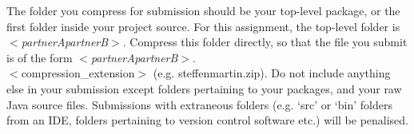 \documentclass[11pt]{article}
\begin{document}
The folder you compress for submission should be your top-level package, or the first folder inside your project source. For this assignment, the top-level folder is $<$\emph{partnerApartnerB}$>$. Compress this folder directly, so that the file you submit is of the form $<$\emph{partnerApartnerB}$>$.\\ $<$compression\_extension$>$ (e.g. steffenmartin.zip). Do not include anything else in your submission except folders pertaining to your packages, and your raw Java source files. Submissions with extraneous folders (e.g. `src' or `bin' folders from an IDE, folders pertaining to version control software etc.) will be penalised.
\end{document}
